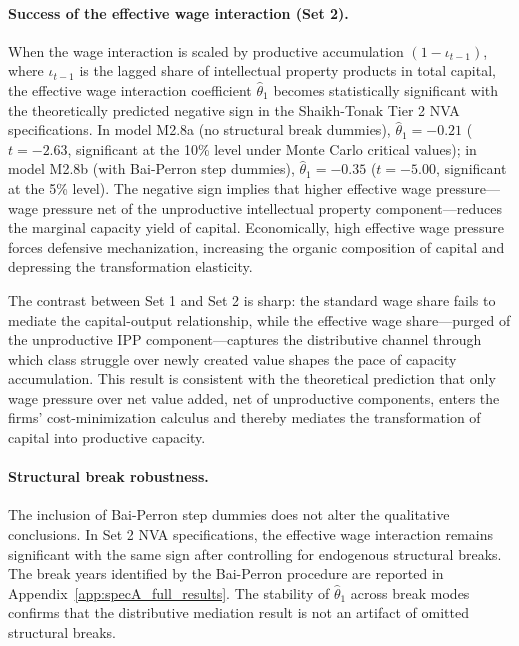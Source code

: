 \paragraph{Success of the effective wage interaction (Set 2).}
When the wage interaction is scaled by productive accumulation
$(1 - \iota_{t-1})$, where $\iota_{t-1}$ is the lagged share of
intellectual property products in total capital, the effective wage
interaction coefficient $\hat{\theta}_1$ becomes statistically
significant with the theoretically predicted negative sign in the
Shaikh-Tonak Tier 2 NVA specifications. In model M2.8a (no
structural break dummies), $\hat{\theta}_1 = -0.21$ ($t = -2.63$,
significant at the 10\% level under Monte Carlo critical values);
in model M2.8b (with Bai-Perron step dummies), $\hat{\theta}_1 =
-0.35$ ($t = -5.00$, significant at the 5\% level). The negative
sign implies that higher effective wage pressure---wage pressure
net of the unproductive intellectual property component---reduces
the marginal capacity yield of capital. Economically, high effective
wage pressure forces defensive mechanization, increasing the organic
composition of capital and depressing the transformation elasticity.

The contrast between Set 1 and Set 2 is sharp: the standard wage
share fails to mediate the capital-output relationship, while the
effective wage share---purged of the unproductive IPP
component---captures the distributive channel through which class
struggle over newly created value shapes the pace of capacity
accumulation. This result is consistent with the theoretical
prediction that only wage pressure over net value added, net of
unproductive components, enters the firms' cost-minimization
calculus and thereby mediates the transformation of capital into
productive capacity.

\paragraph{Structural break robustness.}
The inclusion of Bai-Perron step dummies does not alter the
qualitative conclusions. In Set 2 NVA specifications, the effective
wage interaction remains significant with the same sign after
controlling for endogenous structural breaks. The break years
identified by the Bai-Perron procedure are reported in
Appendix~\ref{app:specA_full_results}. The stability of
$\hat{\theta}_1$ across break modes confirms that the distributive
mediation result is not an artifact of omitted structural breaks.

